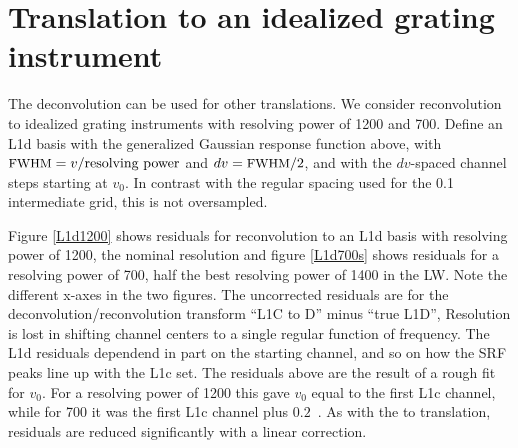 \documentclass[11pt]{article}
\begin{document}
% 
% 
% 

\FloatBarrier
\section{Translation to an idealized grating instrument}
\label{alttrans}

The {\airs} deconvolution can be used for other translations.
We consider reconvolution to idealized grating instruments with
resolving power of 1200 and 700.  Define an {\airs} L1d basis with
the generalized Gaussian response function above, with $\mbox{\small FWHM} = v /
\hbox{resolving power}$ and $dv = \mbox{\small FWHM} / 2$, and with the
$dv$-spaced channel steps starting at $v_0$.  In contrast with the
regular spacing used for the {0.1~\wn} intermediate grid, this is
not oversampled.


Figure \ref{L1d1200} shows residuals for reconvolution to an L1d
basis with resolving power of 1200, the nominal {\airs} resolution
and figure \ref{L1d700s} shows residuals for a resolving power of
700, half the best {\airs} resolving power of 1400 in the LW.  Note
the different x-axes in the two figures.  The uncorrected residuals
are for the deconvolution/reconvolution transform ``L1C to D'' minus
``true L1D'', Resolution is lost in shifting channel centers to a
single regular function of frequency.  The L1d residuals dependend
in part on the starting channel, and so on how the SRF peaks line up
with the L1c set.  The residuals above are the result of a rough fit
for $v_0$.  For a resolving power of 1200 this gave $v_0$ equal to
the first L1c channel, while for 700 it was the first L1c channel
plus $0.2$~\wn.  As with the {\airs} to {\cris} translation,
residuals are reduced significantly with a linear correction.
\end{document}
